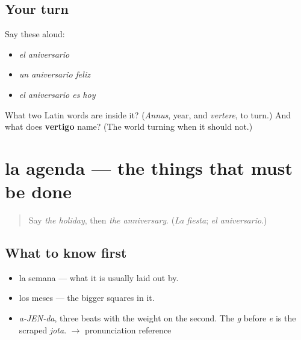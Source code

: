 \subsection*{Your turn}
Say these aloud:

\begin{itemize}
\raggedright
  \item \emph{el aniversario}
  \item \emph{un aniversario feliz}
  \item \emph{el aniversario es hoy}
\end{itemize}

\begin{tcolorbox}[breakable,colback=teal!4,colframe=teal!35!black,title={Before you move on}]
What two Latin words are inside it? (\emph{Annus}, year, and \emph{vertere}, to turn.) And what does \textbf{vertigo} name? (The world turning when it should not.)
\end{tcolorbox}
\section[la agenda]{la agenda — the things that must be done}

\label{lesson:ES-C349-agenda}



\begin{quote}
Say \emph{the holiday}, then \emph{the anniversary}. (\emph{La fiesta}; \emph{el aniversario}.)
\end{quote}

\subsection*{What to know first}
\begin{itemize}
\raggedright
  \item la semana — what it is usually laid out by.
  \item los meses — the bigger squares in it.
\end{itemize}

\begin{sounds}
\begin{itemize}
\raggedright
  \item \emph{a-JEN-da}, three beats with the weight on the second. The \emph{g} before \emph{e} is the scraped \emph{jota}. $\to$ pronunciation reference
\end{itemize}
\end{sounds}

